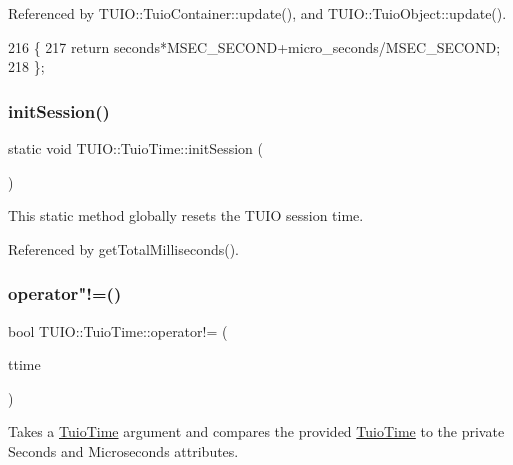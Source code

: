 Referenced by T\+U\+I\+O\+::\+Tuio\+Container\+::update(), and T\+U\+I\+O\+::\+Tuio\+Object\+::update().


\begin{DoxyCode}
216                                     \{
217             \textcolor{keywordflow}{return} seconds*MSEC\_SECOND+micro\_seconds/MSEC\_SECOND;
218         \};
\end{DoxyCode}
\mbox{\label{class_t_u_i_o_1_1_tuio_time_af7e2d2ec80cc6be6188469f5d31fdb94}} 
\subsubsection{\texorpdfstring{init\+Session()}{initSession()}}
{\footnotesize\ttfamily static void T\+U\+I\+O\+::\+Tuio\+Time\+::init\+Session (\begin{DoxyParamCaption}{ }\end{DoxyParamCaption})\hspace{0.3cm}{\ttfamily [static]}}

This static method globally resets the T\+U\+IO session time. 

Referenced by get\+Total\+Milliseconds().

\mbox{\label{class_t_u_i_o_1_1_tuio_time_a658bdc24d71d0ff9180fbde4fae8aa22}} 
\subsubsection{\texorpdfstring{operator"!=()}{operator!=()}}
{\footnotesize\ttfamily bool T\+U\+I\+O\+::\+Tuio\+Time\+::operator!= (\begin{DoxyParamCaption}\item[{\hyperlink{class_t_u_i_o_1_1_tuio_time}{Tuio\+Time}}]{ttime }\end{DoxyParamCaption})\hspace{0.3cm}{\ttfamily [inline]}}

Takes a \hyperlink{class_t_u_i_o_1_1_tuio_time}{Tuio\+Time} argument and compares the provided \hyperlink{class_t_u_i_o_1_1_tuio_time}{Tuio\+Time} to the private Seconds and Microseconds attributes.


